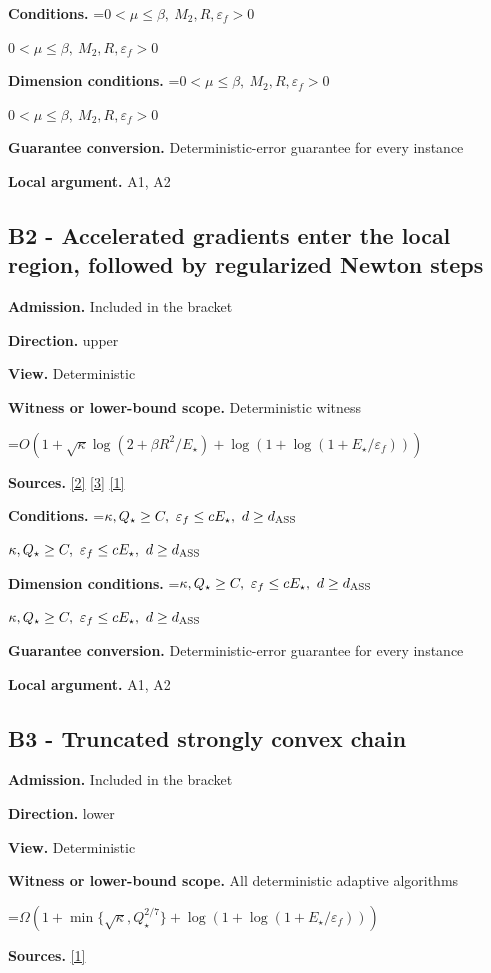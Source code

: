 \documentclass[10pt,a4paper]{article}
\newcommand{\AtlasMath}[1]{\par\begingroup\centering\setbox0=\hbox{$\displaystyle #1$}\ifdim\wd0>1.4\linewidth\typeout{ATLAS WIDE FORMULA: \the\wd0}\fi\ifdim\wd0>\linewidth\resizebox{\linewidth}{!}{\box0}\else\box0\fi\par\endgroup}
\newcommand{\AtlasInlineMath}[1]{\begingroup\setbox0=\hbox{$#1$}\ifdim\wd0>.4\linewidth\endgroup\AtlasMath{#1}\else\endgroup$#1$\fi}
\begin{document}
\textbf{Conditions.} \AtlasInlineMath{0<\mu\le\beta,\ M_2,R,\varepsilon_f>0}

\textbf{Dimension conditions.} \AtlasInlineMath{0<\mu\le\beta,\ M_2,R,\varepsilon_f>0}

\textbf{Guarantee conversion.} Deterministic-error guarantee for every instance

\textbf{Local argument.} A1, A2

\subsection{B2 - Accelerated gradients enter the local region, followed by regularized Newton steps}
\textbf{Admission.} Included in the bracket

\textbf{Direction.} upper

\textbf{View.} Deterministic

\textbf{Witness or lower-bound scope.} Deterministic witness

\AtlasMath{O(1+\sqrt\kappa\log(2+\beta R^2/E_\star)+\log(1+\log(1+E_\star/\varepsilon_f)))}
\textbf{Sources.} \href{https://arxiv.org/pdf/2205.09647v1}{[2]} \href{https://arxiv.org/pdf/2010.06642v2}{[3]} \href{https://arxiv.org/pdf/1705.07260v2}{[1]}

\textbf{Conditions.} \AtlasInlineMath{\kappa,Q_\star\ge C,\ \varepsilon_f\le cE_\star,\ d\ge d_{\rm ASS}}

\textbf{Dimension conditions.} \AtlasInlineMath{\kappa,Q_\star\ge C,\ \varepsilon_f\le cE_\star,\ d\ge d_{\rm ASS}}

\textbf{Guarantee conversion.} Deterministic-error guarantee for every instance

\textbf{Local argument.} A1, A2

\subsection{B3 - Truncated strongly convex chain}
\textbf{Admission.} Included in the bracket

\textbf{Direction.} lower

\textbf{View.} Deterministic

\textbf{Witness or lower-bound scope.} All deterministic adaptive algorithms

\AtlasMath{\Omega(1+\min\{\sqrt\kappa,Q_\star^{2/7}\}+\log(1+\log(1+E_\star/\varepsilon_f)))}
\textbf{Sources.} \href{https://arxiv.org/pdf/1705.07260v2}{[1]}
\end{document}
